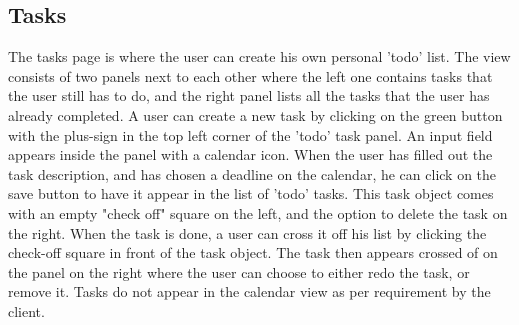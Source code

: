 \subsection{Tasks}

The tasks page is where the user can create his own personal 'todo' list. The view consists of two
panels next to each other where the left one contains tasks that the user still has to do,
and the right panel lists all the tasks that the user has already completed. A user can create
a new task by clicking on the green button with the plus-sign in the top left corner of the 'todo' task
panel. An input field appears inside the panel with a calendar icon. When the user has filled out
the task description, and has chosen a deadline on the calendar, he can click on the save button to have
it appear in the list of 'todo' tasks. This task object comes with an empty "check off" square on the left,
and the option to delete the task on the right. When the task is done, a user can cross it off his list by
clicking the check-off square in front of the task object. The task then appears crossed of on the panel on
the right where the user can choose to either redo the task, or remove it. Tasks do not appear in the calendar
view as per requirement by the client.

